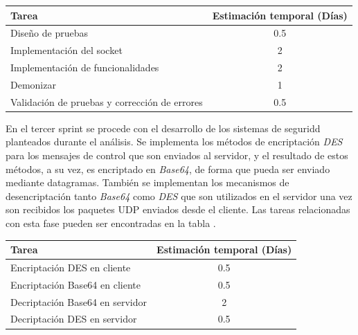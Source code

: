 \documentclass[12pt]{article}
\begin{document}
            \begin{tabular}{|l|c|}
                \hline
                \textbf{Tarea}                                                              &   \textbf{Estimación temporal} (Días) \\           
                \hline
                Diseño de pruebas                                                           &   0.5                                 \\
                Implementación del socket                                                   &   2                                   \\
                Implementación de funcionalidades                                           &   2                                   \\
                Demonizar                                                                   &   1                                   \\
                Validación de pruebas y corrección de errores                               &   0.5                                 \\
                \hline
            \end{tabular}

            En el tercer sprint se procede con el desarrollo de los sistemas de seguridd planteados durante el análisis. Se implementa los métodos de encriptación \textit{DES} para los mensajes de control que son enviados al servidor, y el resultado de estos métodos, a su vez, es encriptado en \textit{Base64}, de forma que pueda ser enviado mediante datagramas. También se implementan los mecanismos de desencriptación tanto \textit{Base64} como \textit{DES} que son utilizados en el servidor una vez son recibidos los paquetes UDP enviados desde el cliente. Las tareas relacionadas con esta fase pueden ser encontradas en la tabla .

            \begin{tabular}{|l|c|}
                \hline
                \textbf{Tarea}                                                              &   \textbf{Estimación temporal} (Días) \\           
                \hline
                Encriptación DES en cliente                                                 &   0.5                                 \\
                Encriptación Base64 en cliente                                              &   0.5                                 \\
                Decriptación Base64 en servidor                                             &   2                                   \\
                Decriptación DES en servidor                                                &   0.5                                 \\
                \hline
            \end{tabular}
\end{document}
